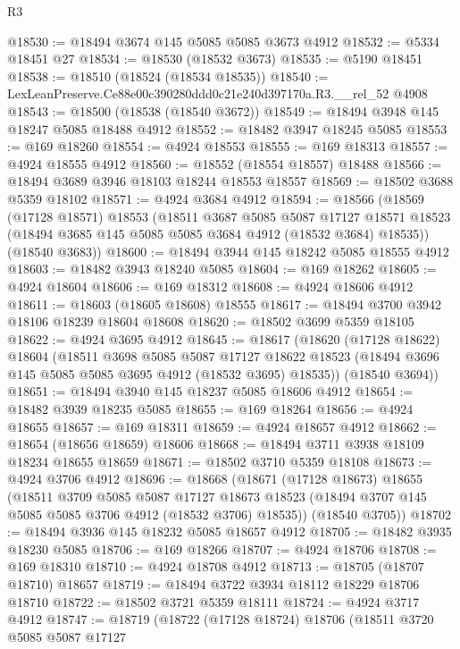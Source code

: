 \begin{lexlean}{R3}
\begin{coremodule}
@18530 := @18494 @3674 @145 @5085 @5085 @3673 @4912
@18532 := @5334 @18451 @27
@18534 := @18530 (@18532 @3673)
@18535 := @5190 @18451
@18538 := @18510 (@18524 (@18534 @18535))
@18540 := LexLeanPreserve.Ce88e00c390280ddd0c21e240d397170a.R3.__rel_52 @4908
@18543 := @18500 (@18538 (@18540 @3672))
@18549 := @18494 @3948 @145 @18247 @5085 @18488 @4912
@18552 := @18482 @3947 @18245 @5085
@18553 := @169 @18260
@18554 := @4924 @18553
@18555 := @169 @18313
@18557 := @4924 @18555 @4912
@18560 := @18552 (@18554 @18557) @18488
@18566 := @18494 @3689 @3946 @18103 @18244 @18553 @18557
@18569 := @18502 @3688 @5359 @18102
@18571 := @4924 @3684 @4912
@18594 := @18566
    (@18569
      (@17128 @18571)
      @18553
      (@18511
        @3687
        @5085
        @5087
        @17127
        @18571
        @18523
        (@18494 @3685 @145 @5085 @5085 @3684 @4912 (@18532 @3684) @18535))
      (@18540 @3683))
@18600 := @18494 @3944 @145 @18242 @5085 @18555 @4912
@18603 := @18482 @3943 @18240 @5085
@18604 := @169 @18262
@18605 := @4924 @18604
@18606 := @169 @18312
@18608 := @4924 @18606 @4912
@18611 := @18603 (@18605 @18608) @18555
@18617 := @18494 @3700 @3942 @18106 @18239 @18604 @18608
@18620 := @18502 @3699 @5359 @18105
@18622 := @4924 @3695 @4912
@18645 := @18617
    (@18620
      (@17128 @18622)
      @18604
      (@18511
        @3698
        @5085
        @5087
        @17127
        @18622
        @18523
        (@18494 @3696 @145 @5085 @5085 @3695 @4912 (@18532 @3695) @18535))
      (@18540 @3694))
@18651 := @18494 @3940 @145 @18237 @5085 @18606 @4912
@18654 := @18482 @3939 @18235 @5085
@18655 := @169 @18264
@18656 := @4924 @18655
@18657 := @169 @18311
@18659 := @4924 @18657 @4912
@18662 := @18654 (@18656 @18659) @18606
@18668 := @18494 @3711 @3938 @18109 @18234 @18655 @18659
@18671 := @18502 @3710 @5359 @18108
@18673 := @4924 @3706 @4912
@18696 := @18668
    (@18671
      (@17128 @18673)
      @18655
      (@18511
        @3709
        @5085
        @5087
        @17127
        @18673
        @18523
        (@18494 @3707 @145 @5085 @5085 @3706 @4912 (@18532 @3706) @18535))
      (@18540 @3705))
@18702 := @18494 @3936 @145 @18232 @5085 @18657 @4912
@18705 := @18482 @3935 @18230 @5085
@18706 := @169 @18266
@18707 := @4924 @18706
@18708 := @169 @18310
@18710 := @4924 @18708 @4912
@18713 := @18705 (@18707 @18710) @18657
@18719 := @18494 @3722 @3934 @18112 @18229 @18706 @18710
@18722 := @18502 @3721 @5359 @18111
@18724 := @4924 @3717 @4912
@18747 := @18719
    (@18722
      (@17128 @18724)
      @18706
      (@18511
        @3720
        @5085
        @5087
        @17127

\end{coremodule}
\end{lexlean}
